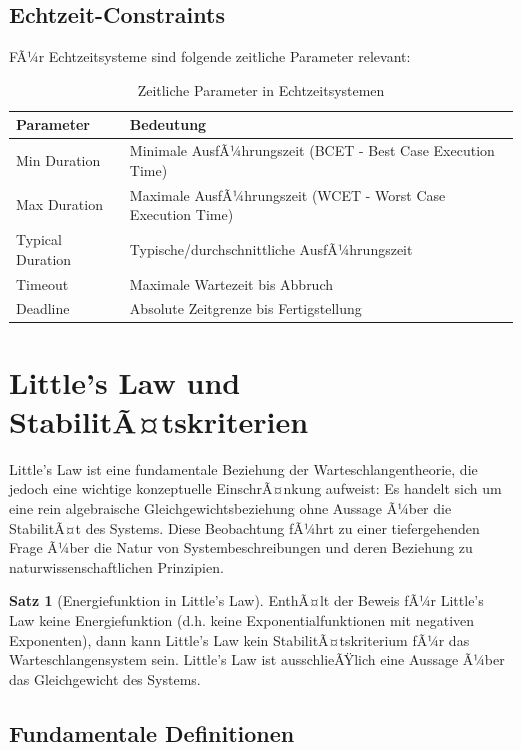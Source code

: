 ﻿\documentclass[a4paper,12pt]{scrreprt}
\theoremstyle{definition}
\newtheorem{satz}{Satz}[section]
\begin{document}
\subsection{Echtzeit-Constraints}

FÃ¼r Echtzeitsysteme sind folgende zeitliche Parameter relevant:

\begin{table}[H]
	\centering
	\begin{tabular}{@{}lp{8cm}@{}}
		\toprule
		\textbf{Parameter} & \textbf{Bedeutung} \\
		\midrule
		Min Duration & Minimale AusfÃ¼hrungszeit (BCET - Best Case Execution Time) \\
		Max Duration & Maximale AusfÃ¼hrungszeit (WCET - Worst Case Execution Time) \\
		Typical Duration & Typische/durchschnittliche AusfÃ¼hrungszeit \\
		Timeout & Maximale Wartezeit bis Abbruch \\
		Deadline & Absolute Zeitgrenze bis Fertigstellung \\
		\bottomrule
	\end{tabular}
	\caption{Zeitliche Parameter in Echtzeitsystemen}
	\label{tab:timing-params}
\end{table}

\section{Little's Law und StabilitÃ¤tskriterien}

Little's Law ist eine fundamentale Beziehung der Warteschlangentheorie, die jedoch eine wichtige konzeptuelle EinschrÃ¤nkung aufweist: Es handelt sich um eine rein algebraische Gleichgewichtsbeziehung ohne Aussage Ã¼ber die StabilitÃ¤t des Systems. Diese Beobachtung fÃ¼hrt zu einer tiefergehenden Frage Ã¼ber die Natur von Systembeschreibungen und deren Beziehung zu naturwissenschaftlichen Prinzipien.

\begin{satz}[Energiefunktion in Little's Law]
	EnthÃ¤lt der Beweis fÃ¼r Little's Law keine Energiefunktion (d.h. keine Exponentialfunktionen mit negativen Exponenten), dann kann Little's Law kein StabilitÃ¤tskriterium fÃ¼r das Warteschlangensystem sein. Little's Law ist ausschlieÃŸlich eine Aussage Ã¼ber das Gleichgewicht des Systems.
\end{satz}

\subsection{Fundamentale Definitionen}
\end{document}
